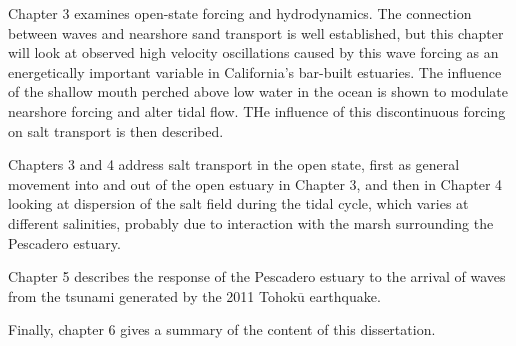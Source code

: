 Chapter 3 examines open-state forcing and hydrodynamics. The connection between waves and nearshore sand transport is well established, but this chapter will look at observed high velocity oscillations caused by this wave forcing as an energetically important variable in California's bar-built estuaries. The influence of the shallow mouth perched above low water in the ocean is shown to modulate nearshore forcing and alter tidal flow. THe influence of this discontinuous forcing on salt transport is then described.

Chapters 3 and 4 address salt transport in the open state, first as general movement into and out of the open estuary in Chapter 3, and then in Chapter 4 looking at dispersion of the salt field during the tidal cycle, which varies at different salinities, probably due to interaction with the marsh surrounding the Pescadero estuary.

Chapter 5 describes the response of the Pescadero estuary to the arrival of waves from the tsunami generated by the 2011 Tohok$\overline{\mathrm{u}}$ earthquake. 

Finally, chapter 6 gives a summary of the content of this dissertation.







